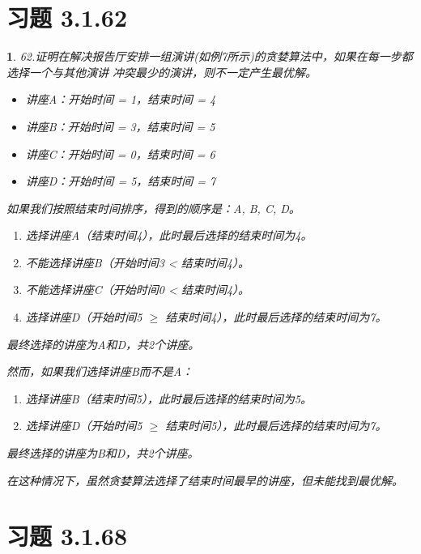 \documentclass[UTF8]{report}
\theoremstyle{MyLineTheoremStyle} %
\theoremstyle{MyBlockTheoremStyle} %
\theoremstyle{MySubsubsectionStyle} %
\newtheorem{definition}{}
\begin{document}
\section{习题 3.1.62}

\begin{definition}
    62.证明在解决报告厅安排一组演讲(如例7所示)的贪婪算法中，如果在每一步都选择一个与其他演讲
冲突最少的演讲，则不一定产生最优解。
\begin{itemize}
    \item 讲座A：开始时间 = 1，结束时间 = 4
    \item 讲座B：开始时间 = 3，结束时间 = 5
    \item 讲座C：开始时间 = 0，结束时间 = 6
    \item 讲座D：开始时间 = 5，结束时间 = 7
\end{itemize}

如果我们按照结束时间排序，得到的顺序是：A, B, C, D。

\begin{enumerate}
    \item 选择讲座A（结束时间4），此时最后选择的结束时间为4。
    \item 不能选择讲座B（开始时间3 < 结束时间4）。
    \item 不能选择讲座C（开始时间0 < 结束时间4）。
    \item 选择讲座D（开始时间5 $\geq$ 结束时间4），此时最后选择的结束时间为7。
\end{enumerate}

最终选择的讲座为A和D，共2个讲座。

然而，如果我们选择讲座B而不是A：

\begin{enumerate}
    \item 选择讲座B（结束时间5），此时最后选择的结束时间为5。
    \item 选择讲座D（开始时间5 $\geq$ 结束时间5），此时最后选择的结束时间为7。
\end{enumerate}

最终选择的讲座为B和D，共2个讲座。

在这种情况下，虽然贪婪算法选择了结束时间最早的讲座，但未能找到最优解。
\end{definition}

\section{习题 3.1.68}
\end{document}
